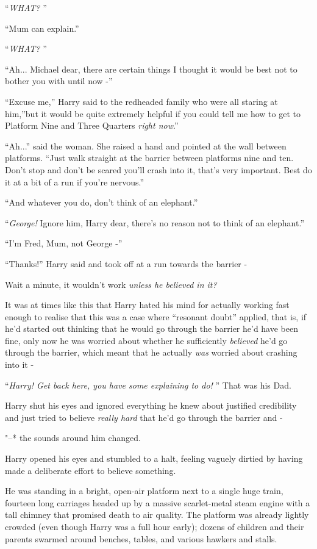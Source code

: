 ``\emph{WHAT?} ''

``Mum can explain.''

``\emph{WHAT?} ''

``Ah... Michael dear, there are certain things I thought it would
be best not to bother you with until now -''

``Excuse me,'' Harry said to the redheaded family who were all staring
at him,''but it would be quite extremely helpful if you could tell me
how to get to Platform Nine and Three Quarters \emph{right now}.''

``Ah...'' said the woman. She raised a hand and pointed at the wall
between platforms. ``Just walk straight at the barrier between platforms
nine and ten. Don't stop and don't be scared you'll crash into it,
that's very important. Best do it at a bit of a run if you're nervous.''

``And whatever you do, don't think of an elephant.''

``\emph{George!} Ignore him, Harry dear, there's no reason not to think
of an elephant.''

``I'm Fred, Mum, not George -''

``Thanks!'' Harry said and took off at a run towards the barrier -

Wait a minute, it wouldn't work \emph{unless he believed in it?}

It was at times like this that Harry hated his mind for actually working
fast enough to realise that this was a case where ``resonant doubt''
applied, that is, if he'd started out thinking that he would go through
the barrier he'd have been fine, only now he was worried about whether
he sufficiently \emph{believed} he'd go through the barrier, which meant
that he actually \emph{was} worried about crashing into it -

``\emph{Harry! Get back here, you have some explaining to do!} '' That was
his Dad.

Harry shut his eyes and ignored everything he knew about justified
credibility and just tried to believe \emph{really hard} that he'd go
through the barrier and -

"--* the sounds around him changed.

Harry opened his eyes and stumbled to a halt, feeling vaguely dirtied by
having made a deliberate effort to believe something.

He was standing in a bright, open-air platform next to a single huge
train, fourteen long carriages headed up by a massive scarlet-metal
steam engine with a tall chimney that promised death to air quality. The
platform was already lightly crowded (even though Harry was a full hour
early); dozens of children and their parents swarmed around benches,
tables, and various hawkers and stalls.

